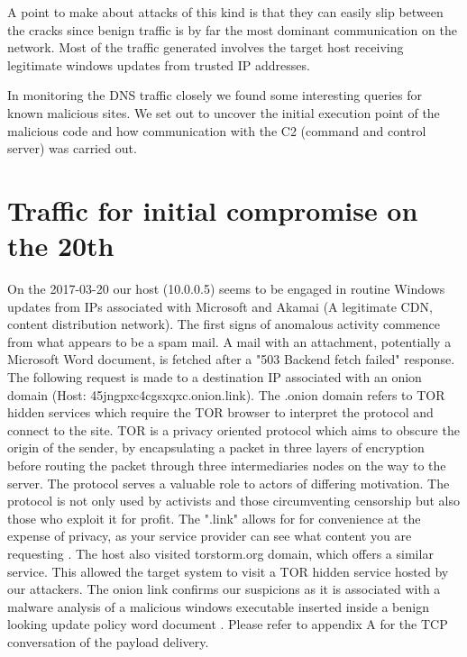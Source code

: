 \documentclass[11pt]{diazessay} %
\begin{document}
A point to make about attacks of this kind is that they can easily slip between the cracks since benign traffic is by far the most dominant communication on the network. Most of the traffic generated involves the target host receiving legitimate windows updates from trusted IP addresses. 

In monitoring the DNS traffic closely we found some interesting queries for known malicious sites. We set out to uncover the initial execution point of the malicious code and how communication with the C2 (command and control server) was carried out.



\section*{Traffic for initial compromise on the 20th}

On the 2017-03-20 our host (10.0.0.5) seems to be engaged in routine Windows updates from IPs associated with Microsoft and Akamai (A legitimate CDN, content distribution network). The first signs of anomalous activity commence from what appears to be a spam mail. A mail with an attachment, potentially a Microsoft Word document, is fetched after a "503 Backend fetch failed" response. The following request is made to a destination IP associated with an onion domain (Host: 45jngpxc4cgsxqxc.onion.link). The .onion domain refers to TOR hidden services which require the TOR browser to interpret the protocol and connect to the site. TOR is a privacy oriented protocol which aims to obscure the origin of the sender, by encapsulating a packet in three layers of encryption before routing the packet through three intermediaries nodes on the way to the server. The protocol serves a valuable role to actors of differing motivation. The protocol is not only used by activists and those circumventing censorship but also those who exploit it for profit. The ".link" allows for for convenience at the expense of privacy, as your service provider can see what content you are requesting \cite{onionlink}. The host also visited  torstorm.org domain, which offers a similar service. This allowed the target system to visit a TOR hidden service hosted by our attackers. The onion link confirms our suspicions as it is associated with a malware analysis of a malicious windows executable inserted inside a benign looking update policy word document \cite{hybrid}. Please refer to appendix A for the TCP conversation of the payload delivery.
\end{document}
